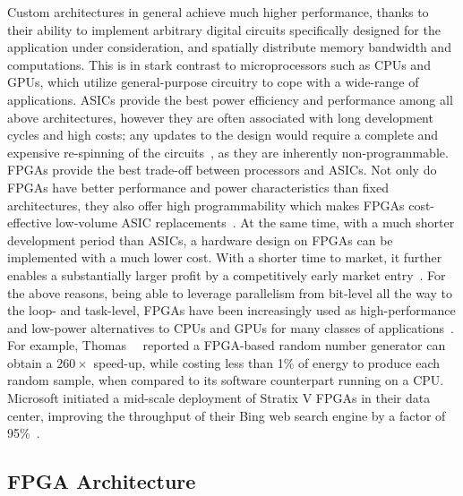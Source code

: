 Custom architectures in general achieve much higher performance, thanks to
their ability to implement arbitrary digital circuits specifically designed for
the application under consideration, and spatially distribute memory bandwidth
and computations.  This is in stark contrast to microprocessors such as CPUs
and GPUs, which utilize general-purpose circuitry to cope with a wide-range
of applications.  ASICs provide the best power efficiency and performance
among all above architectures, however they are often associated with long
development cycles and high costs; any updates to the design would require a
complete and expensive re-spinning of the circuits~\cite{bacon13}, as they
are inherently non-programmable.  FPGAs provide the best trade-off between
processors and ASICs.  Not only do FPGAs have better performance and power
characteristics than fixed architectures, they also offer high programmability
which makes FPGAs cost-effective low-volume ASIC replacements~\cite{karen04,
bacon13}.  At the same time, with a much shorter development period than ASICs,
a hardware design on FPGAs can be implemented with a much lower cost.  With a
shorter time to market, it further enables a substantially larger profit by
a competitively early market entry~\cite{semico12}.  For the above reasons,
being able to leverage parallelism from bit-level all the way to the loop- and
task-level, FPGAs have been increasingly used as high-performance and low-power
alternatives to CPUs and GPUs for many classes of applications~\cite{bacon13,
brodtkorb10, sirowy08}.  For example, Thomas~\etal~\cite{thomas09} reported a
FPGA-based random number generator can obtain a $260\times$ speed-up, while
costing less than 1\% of energy to produce each random sample, when compared to
its software counterpart running on a CPU\@.  Microsoft initiated a mid-scale
deployment of Stratix V FPGAs in their data center, improving the throughput of
their Bing web search engine by a factor of 95\%~\cite{catapult}.


\subsection{FPGA Architecture}
\label{bg:sub:fpga_architecture}

